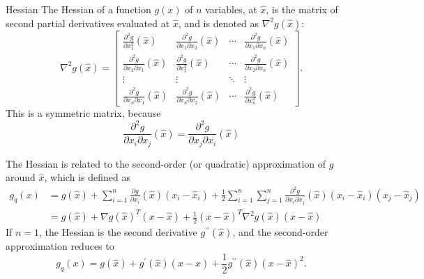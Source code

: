 \begin{definition}
    Hessian The Hessian of a function $ g(x) $ of $ n $ variables, at $ \hat{x} $, is the matrix of second partial derivatives evaluated at $ \hat{x} $, and is denoted as $ \nabla^{2} g(\hat{x}): $
\begin{equation}
\nabla^{2} g(\hat{x})=\left[\begin{array}{cccc}
\frac{\partial^{2} g}{\partial x_{1}^{2}}(\hat{x}) & \frac{\partial^{2} g}{\partial x_{1} \partial x_{2}}(\hat{x}) & \cdots & \frac{\partial^{2} g}{\partial x_{1} \partial x_{n}}(\hat{x}) \\
\frac{\partial^{2} g}{\partial x_{2} \partial x_{1}}(\hat{x}) & \frac{\partial^{2} g}{\partial x_{2}^{2}}(\hat{x}) & \cdots & \frac{\partial^{2} g}{\partial x_{2} \partial x_{n}}(\hat{x}) \\
\vdots & \vdots & \ddots & \vdots \\
\frac{\partial^{2} g}{\partial x_{n} \partial x_{1}}(\hat{x}) & \frac{\partial^{2} g}{\partial x_{n} \partial x_{2}}(\hat{x}) & \cdots & \frac{\partial^{2} g}{\partial x_{n}^{2}}(\hat{x})
\end{array}\right] .
\end{equation}
This is a symmetric matrix, because
\begin{equation}
\frac{\partial^{2} g}{\partial x_{i} \partial x_{j}}(\hat{x})=\frac{\partial^{2} g}{\partial x_{j} \partial x_{i}}(\hat{x})
\end{equation}
\end{definition}

The Hessian is related to the second-order (or quadratic) approximation of $ g $ around $ \hat{x} $, which is defined as
\begin{equation}
\begin{aligned}
g_{{q}}(x) &=g(\hat{x})+\sum_{i=1}^{n} \frac{\partial g}{\partial x_{i}}(\hat{x})\left(x_{i}-\hat{x}_{i}\right)+\frac{1}{2} \sum_{i=1}^{n} \sum_{j=1}^{n} \frac{\partial^{2} g}{\partial x_{i} \partial x_{j}}(\hat{x})\left(x_{i}-\hat{x}_{i}\right)\left(x_{j}-\hat{x}_{j}\right) \\
&=g(\hat{x})+\nabla g(\hat{x})^{T}(x-\hat{x})+\frac{1}{2}(x-\hat{x})^{T} \nabla^{2} g(\hat{x})(x-\hat{x})
\end{aligned}
\end{equation}
If $ n=1 $, the Hessian is the second derivative $ g^{\prime \prime}(\hat{x}) $, and the second-order approximation reduces to
\begin{equation}
g_{{q}}(x)=g(\hat{x})+g^{\prime}(\hat{x})(x-\hat{x})+\frac{1}{2} g^{\prime \prime}(\hat{x})(x-\hat{x})^{2} .
\end{equation}

